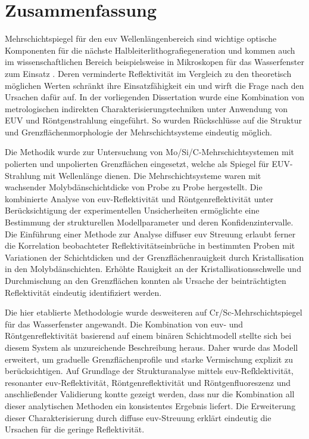 \cleardoublepage

\thispagestyle{empty}

\section*{Zusammenfassung}

    Mehrschichtspiegel für den \gls{euv} Wellenlängenbereich sind wichtige optische Komponenten für die nächste Halbleiterlithografiegeneration und kommen auch im wissenschaftlichen Bereich beispielsweise in Mikroskopen für das Wasserfenster zum Einsatz . Deren verminderte Reflektivität im Vergleich zu den theoretisch möglichen Werten schränkt ihre Einsatzfähigkeit ein und wirft die Frage nach den Ursachen dafür auf. In der vorliegenden Dissertation wurde eine Kombination von metrologischen indirekten Charakterisierungstechniken unter Anwendung von EUV und Röntgenstrahlung eingeführt. So wurden Rückschlüsse auf die Struktur und Grenzflächenmorphologie der Mehrschichtsysteme eindeutig möglich.

    Die Methodik wurde zur Untersuchung von Mo/Si/C-Mehrschichtsystemen mit polierten und unpolierten Grenzflächen eingesetzt, welche als Spiegel für EUV-Strahlung mit  Wellenlänge dienen. Die Mehrschichtsysteme waren mit wachsender Molybdänschichtdicke von Probe zu Probe hergestellt. Die kombinierte Analyse von \gls{euv}-Reflektivität und Röntgenreflektivität unter Berücksichtigung der experimentellen Unsicherheiten ermöglichte eine Bestimmung der strukturellen Modellparameter und deren Konfidenzintervalle. Die Einführung einer Methode zur Analyse diffuser \gls{euv} Streuung erlaubt ferner die Korrelation beobachteter Reflektivitätseinbrüche in bestimmten Proben mit Variationen der Schichtdicken und der Grenzflächenrauigkeit durch Kristallisation in den Molybdänschichten. Erhöhte Rauigkeit an der Kristallisationsschwelle und Durchmischung an den Grenzflächen konnten als Ursache der beinträchtigten Reflektivität eindeutig identifiziert werden.

    Die hier etablierte Methodologie wurde desweiteren auf Cr/Sc-Mehrschichtspiegel für das Wasserfenster angewandt. Die Kombination von \gls{euv}- und Röntgenreflektivität basierend auf einem binären Schichtmodell stellte sich bei diesem System als unzureichende Beschreibung heraus. Daher wurde das Modell erweitert, um graduelle Grenzflächenprofile und starke Vermischung explizit zu berücksichtigen. Auf Grundlage der Strukturanalyse mittels \gls{euv}-Refklektivität, resonanter \gls{euv}-Reflektivität, Röntgenreflektivität und Röntgenfluoreszenz und anschließender Validierung kontte gezeigt werden, dass nur die Kombination all dieser analytischen Methoden ein konsistentes Ergebnis liefert. Die Erweiterung dieser Charakterisierung durch diffuse \gls{euv}-Streuung erklärt eindeutig die Ursachen für die geringe Reflektivität.

\cleardoublepage
